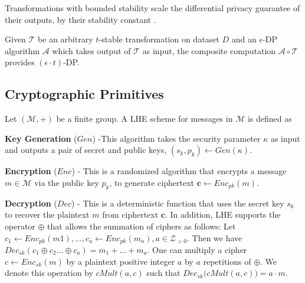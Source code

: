 Transformations with bounded stability scale the differential privacy guarantee of their outputs, by their stability constant \cite{PINQ}.
\begin{theorem}\label{theorem:stability}
Given $\mathcal{T}$ be an arbitrary $t$-stable transformation on dataset $D$ and an $\epsilon$-DP algorithm $\mathcal{A}$ which takes output of $\mathcal{T}$ as input, the composite computation $\mathcal{A} \circ \mathcal{T}$ provides $(\epsilon \cdot t)$-DP.\end{theorem}

\subsection{Cryptographic Primitives}
Let $(\mathcal{M}, +)$ be a finite group. A \textsf{LHE} scheme
for messages in $\mathcal{M}$ is defined  as \squishlist
\item \textbf{Key Generation }($Gen$) -This  algorithm takes the security parameter $\kappa$ as input and outputs
a pair of secret and public keys, $(s_k, p_k) \leftarrow Gen(\kappa)$.
\item \textbf{Encryption} ($Enc$) - This is a randomized algorithm that encrypts a message $m \in \mathcal{M}$ via the public key $p_k$, to generate ciphertext $\mathbf{c} \leftarrow Enc_{pk}(m)$.
\item \textbf{Decryption} ($Dec$) - This is a deterministic function that uses the secret key $s_k$ to
recover the plaintext $m$ from ciphertext $\mathbf{c}$.
\squishend
In addition, \textsf{LHE} supports the operator $\oplus$ that allows the summation of ciphers as follows:
Let $c_1 \leftarrow Enc_{pk}(m1), \ldots, c_a \leftarrow Enc_{pk}(m_a), a \in \mathcal{Z}_{>0}$. Then we have  $Dec_{sk}(c_1\oplus c_2 ...\oplus c_a)=    m_1 + \ldots   + m_a$.
One can multiply a cipher $c\leftarrow  Enc_{sk}(m)$ by a plaintext positive integer $a$ by $a$ repetitions of $\oplus$. We denote this operation by $cMult(a,c)$ such that $Dec_{sk}\big(cMult(a,c)\big)=a\cdot m$.

